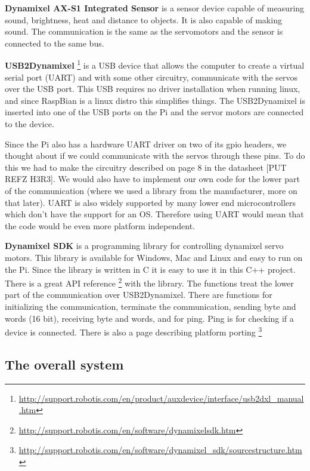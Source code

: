 \textbf{Dynamixel AX-S1 Integrated Sensor}
is a sensor device capable of measuring sound, brightness, heat and distance to objects. It is also capable of making sound. The communication is the same as the servomotors and the sensor is connected to the same bus. 
\vspace{\secspace}

\textbf{USB2Dynamixel} \footnote{\url{http://support.robotis.com/en/product/auxdevice/interface/usb2dxl_manual.htm}} is a USB device that allows the computer to create a virtual serial port (UART) and with some other circuitry, communicate with the servos over the USB port.
This USB requires no driver installation when running linux, and since RaspBian is a linux distro this simplifies things. 
The USB2Dynamixel is inserted into one of the USB ports on the Pi and the servor motors are connected to the device.

Since the Pi also has a hardware UART driver on two of its gpio headers, we thought about if we could communicate with the servos through these pins. 
To do this we had to make the circuitry described on page 8 in the datasheet [PUT REFZ H3R3]. 
We would also have to implement our own code for the lower part of the communication (where we used a library from the manufacturer, more on that later).
UART is also widely supported by many lower end microcontrollers which don't have the support for an OS. 
Therefore using UART would mean that the code would be even more platform independent.
\vspace{\secspace}

\textbf{Dynamixel SDK} is a programming library for controlling dynamixel servo motors. 
This library is available for Windows, Mac and Linux and easy to run on the Pi. 
Since the library is written in C it is easy to use it in this C++ project.
There is a great API reference \footnote{\url{http://support.robotis.com/en/software/dynamixelsdk.htm}} with the library.
The functions treat the lower part of the communication over USB2Dynamixel.
There are functions for initializing the communication, terminate the communication, sending byte and words (16 bit), receiving byte and words, and for ping. Ping is for checking if a device is connected.
There is also a page describing platform porting \footnote{\url{http://support.robotis.com/en/software/dynamixel_sdk/sourcestructure.htm}}


\subsection{The overall system}

